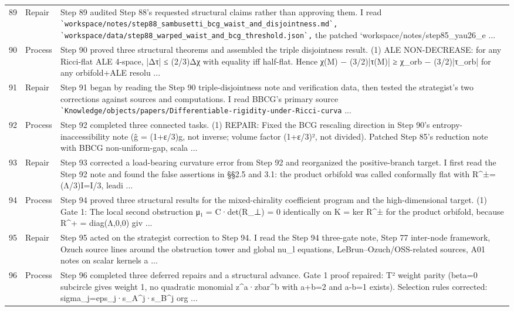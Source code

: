 \documentclass[UTF8,fontset=fandol,zihao=-4]{ctexart}
\begin{document}
\begin{longtable}{r p{} >{\raggedright\arraybackslash}p{}}
89 & Repair & Step 89 audited Step 88's requested structural claims rather than approving them. I read \nolinkurl{`workspace/notes/step88_sambusetti_bcg_waist_and_disjointness.md`,} \nolinkurl{`workspace/data/step88_warped_waist_and_bcg_threshold.json`,} the patched `workspace/notes/step85\_yau26\_e ...\\
90 & Process & Step 90 proved three structural theorems and assembled the triple disjointness result. (1) ALE NON-DECREASE: for any Ricci-flat ALE 4-space, |Δτ| ≤ (2/3)Δχ with equality iff half-flat. Hence χ(M) − (3/2)|τ(M)| ≥ χ\_orb − (3/2)|τ\_orb| for any orbifold+ALE resolu ...\\
91 & Repair & Step 91 began by reading the Step 90 triple-disjointness note and verification data, then tested the strategist's two corrections against sources and computations. I read BBCG's primary source \nolinkurl{`Knowledge/objects/papers/Differentiable-rigidity-under-Ricci-curva} ...\\
92 & Process & Step 92 completed three connected tasks. (1) REPAIR: Fixed the BCG rescaling direction in Step 90's entropy-inaccessibility note (ĝ = (1+ε/3)g, not inverse; volume factor (1+ε/3)², not divided). Patched Step 85's reduction note with BBCG non-uniform-gap, scala ...\\
93 & Repair & Step 93 corrected a load-bearing curvature error from Step 92 and reorganized the positive-branch target. I first read the Step 92 note and found the false assertions in §§2.5 and 3.1: the product orbifold was called conformally flat with R\textasciicircum{}±=(Λ/3)I=I/3, leadi ...\\
94 & Process & Step 94 proved three structural results for the mixed-chirality coefficient program and the high-dimensional target. (1) Gate 1: The local second obstruction μ₁ = C·det(R\_⊥) = 0 identically on K = ker R\textasciicircum{}± for the product orbifold, because R\textasciicircum{}+ = diag(Λ,0,0) giv ...\\
95 & Repair & Step 95 acted on the strategist correction to Step 94. I read the Step 94 three-gate note, Step 77 inter-node framework, Ozuch source lines around the obstruction tower and global nu\_l equations, LeBrun--Ozuch/OSS-related sources, A01 notes on scalar kernels a ...\\
96 & Process & Step 96 completed three deferred repairs and a structural advance. Gate 1 proof repaired: T² weight parity (beta=0 subcircle gives weight 1, no quadratic monomial z\textasciicircum{}a·zbar\textasciicircum{}b with a+b=2 and a-b=1 exists). Selection rules corrected: sigma\_j=eps\_j·s\_A\textasciicircum{}j·s\_B\textasciicircum{}j org ...\\

\end{longtable}
\end{document}
